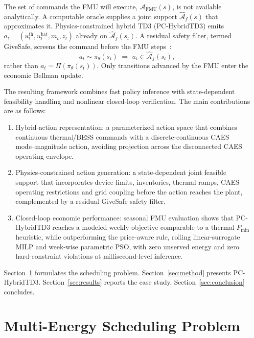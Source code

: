 \documentclass[conference]{IEEEtran}
\newcommand{\Afhat}{\widehat{\mathcal{A}}_{f}}
\newcommand{\AFMU}{\mathcal{A}_{\mathrm{FMU}}}
\begin{document}
The set of commands the FMU will execute, \(\AFMU(s)\), is not available analytically. A computable oracle supplies a joint support \(\Afhat(s)\) that approximates it. Physics-constrained hybrid TD3 (PC-HybridTD3) emits
\(a_t=(u_t^{\mathrm{th}},u_t^{\mathrm{bat}},m_t,z_t)\)
already on \(\Afhat(s_t)\). A residual safety filter, termed GiveSafe, screens the command before the FMU steps~\cite{garcia2015safe,sun2024constrained}:
\begin{equation}
a_t\sim\pi_\theta(s_t)\;\Rightarrow\; a_t\in\Afhat(s_t),
\label{eq:support-gen}
\end{equation}
rather than \(a_t=\Pi(\pi_\theta(s_t))\). Only transitions advanced by the FMU enter the economic Bellman update.

The resulting framework combines fast policy inference with state-dependent feasibility handling and nonlinear closed-loop verification. The main contributions are as follows:
\begin{enumerate}
\item Hybrid-action representation: a parameterized action space that combines continuous thermal/BESS commands with a discrete-continuous CAES mode--magnitude action, avoiding projection across the disconnected CAES operating envelope.
\item Physics-constrained action generation: a state-dependent joint feasible support that incorporates device limits, inventories, thermal ramps, CAES operating restrictions and grid coupling before the action reaches the plant, complemented by a residual GiveSafe safety filter.
\item Closed-loop economic performance: seasonal FMU evaluation shows that PC-HybridTD3 reaches a modeled weekly objective comparable to a thermal-\(P_{\min}\) heuristic, while outperforming the price-aware rule, rolling linear-surrogate MILP and week-wise parametric PSO, with zero unserved energy and zero hard-constraint violations at millisecond-level inference.
\end{enumerate}

Section~\ref{sec:problem} formulates the scheduling problem. Section~\ref{sec:method} presents PC-HybridTD3. Section~\ref{sec:results} reports the case study. Section~\ref{sec:conclusion} concludes.

\section{Multi-Energy Scheduling Problem}
\label{sec:problem}
\end{document}

